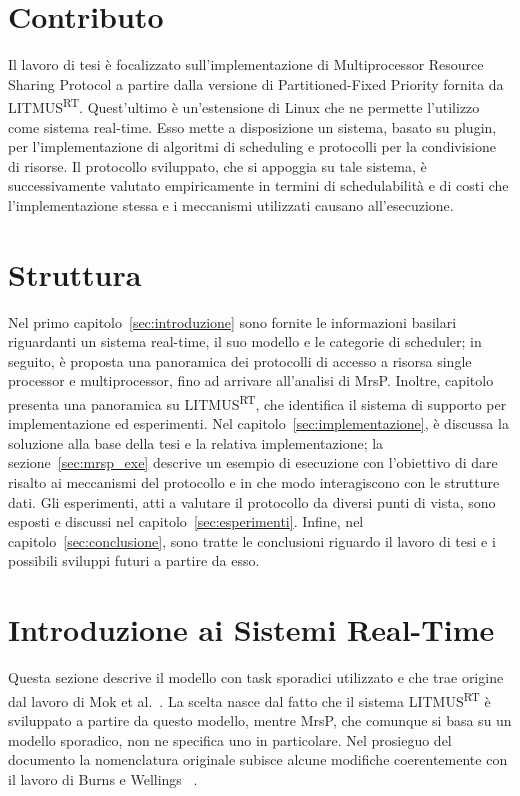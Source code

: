 \section{Contributo}
\label{sec:intro.contributo}

Il lavoro di tesi è focalizzato sull'implementazione di Multiprocessor Resource Sharing Protocol a partire dalla versione di Partitioned-Fixed Priority fornita da LITMUS\textsuperscript{RT}. Quest'ultimo è un'estensione di Linux che ne permette l'utilizzo come sistema real-time. Esso mette a disposizione un sistema, basato su plugin, per l'implementazione di algoritmi di scheduling e protocolli per la condivisione di risorse. Il protocollo sviluppato, che si appoggia su tale sistema, è successivamente valutato empiricamente in termini di schedulabilità e di costi che l'implementazione stessa e i meccanismi utilizzati causano all'esecuzione.

\section{Struttura}
\label{sec:intro.struct}

Nel primo capitolo~\ref{sec:introduzione} sono fornite le informazioni basilari riguardanti un sistema real-time, il suo modello e le categorie di scheduler; in seguito, è proposta una panoramica dei protocolli di accesso a risorsa single processor e multiprocessor, fino ad arrivare all'analisi di MrsP. Inoltre, capitolo presenta una panoramica su LITMUS\textsuperscript{RT}, che identifica il sistema di supporto per implementazione ed esperimenti. Nel capitolo~\ref{sec:implementazione}, è discussa la soluzione alla base della tesi e la relativa implementazione; la sezione~\ref{sec:mrsp_exe} descrive un esempio di esecuzione con l'obiettivo di dare risalto ai meccanismi del protocollo e in che modo interagiscono con le strutture dati. Gli esperimenti, atti a valutare il protocollo da diversi punti di vista, sono esposti e discussi nel capitolo~\ref{sec:esperimenti}. Infine, nel capitolo~\ref{sec:conclusione}, sono tratte le conclusioni riguardo il lavoro di tesi e i possibili sviluppi futuri a partire da esso.

\section{Introduzione ai Sistemi Real-Time}
\label{sec:overviewRTS}

Questa sezione descrive il modello con task sporadici utilizzato e che trae origine dal lavoro di Mok et al.~\cite{Sha:2004:RTS:1028913.1028959}. La scelta nasce dal fatto che il sistema LITMUS\textsuperscript{RT} è sviluppato a partire da questo modello, mentre MrsP, che comunque si basa su un modello sporadico, non ne specifica uno in particolare. Nel prosieguo del documento la nomenclatura originale subisce alcune modifiche coerentemente con il lavoro di Burns e Wellings ~\cite{Burns:2013:SCM:2547348.2547350}.

